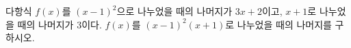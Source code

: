 다항식 $f(x)$를 $(x-1)^2$으로 나누었을 때의 나머지가 $3x+2$이고, $x+1$로 나누었을 때의 나머지가 $3$이다. $f(x)$를 $(x-1)^2(x+1)$로 나누었을 때의 나머지를 구하시오.
